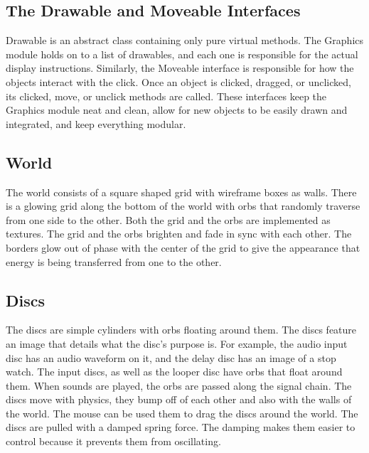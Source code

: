 \documentclass[pdftext,twoside,10pt]{article}
\begin{document}
\subsection{The Drawable and Moveable Interfaces}
Drawable is an abstract class containing only pure virtual methods. The Graphics module holds on to a list of drawables, and each one is responsible for the actual display instructions. Similarly, the Moveable interface is responsible for how the objects interact with the click. Once an object is clicked, dragged, or unclicked, its clicked, move, or unclick methods are called. These interfaces keep the Graphics module neat and clean, allow for new objects to be easily drawn and integrated, and keep everything modular.

\subsection{World}
The world consists of a square shaped grid with wireframe boxes as walls. There is a glowing grid along the bottom of the world with orbs that randomly traverse from one side to the other. Both the grid and the orbs are implemented as textures. The grid and the orbs brighten and fade in sync with each other. The borders glow out of phase with the center of the grid to give the appearance that energy is being transferred from one to the other.

\subsection{Discs}
The discs are simple cylinders with orbs floating around them. The discs feature an image that details what the disc's purpose is. For example, the audio input disc has an audio waveform on it, and the delay disc has an image of a stop watch. The input discs, as well as the looper disc have orbs that float around them. When sounds are played, the orbs are passed along the signal chain. The discs move with physics, they bump off of each other and also with the walls of the world. The mouse can be used them to drag the discs around the world. The discs are pulled with a damped spring force. The damping makes them easier to control because it prevents them from oscillating.
\end{document}

